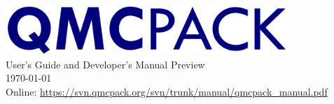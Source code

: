 
\begin{titlepage}
\vspace*{\fill}
\begin{center}

\includegraphics[width=0.8\textwidth]{figures/QMCPACK_logo.png} \\
{\huge User's Guide and Developer's Manual Preview\\}
{
\huge %
\today}\\
{\small
Online: \url{https://svn.qmcpack.org/svn/trunk/manual/qmcpack_manual.pdf}}
  \end{center}
\vspace*{\fill}
\end{titlepage}
